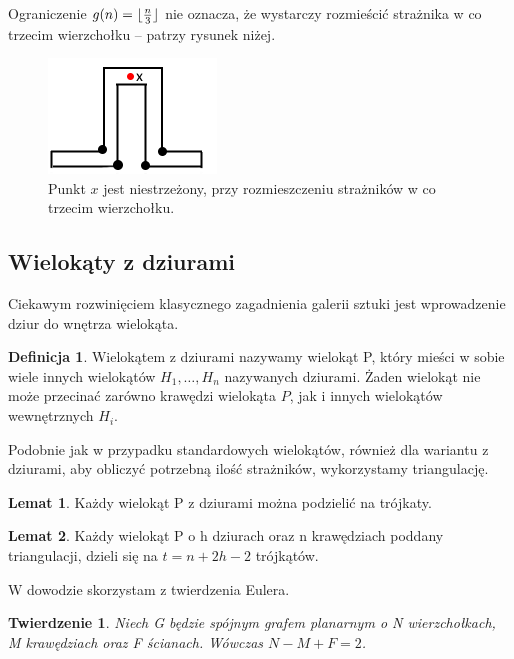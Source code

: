 \documentclass[brudnopis]{xmgr}
\DeclarePairedDelimiter\floor{\lfloor}{\rfloor}
\newtheorem{Twierdzenie}{Twierdzenie} \theoremstyle{definition}
\newtheorem{Lemat}{Lemat} \theoremstyle{definition}
\newtheorem{Definicja}{Definicja} \theoremstyle{definition}
\begin{document}
\newpage\indent Ograniczenie $g(n) = \floor{\frac{n}{3}}$ nie oznacza, że wystarczy rozmieścić strażnika w co trzecim wierzchołku -- patrzy rysunek niżej.
\begin{figure}[ht!]
  \centering
  \includegraphics{rysunki/co_trzeci.png}
  \caption{Punkt $x$ jest niestrzeżony, przy rozmieszczeniu strażników w co trzecim wierzchołku.}
\end{figure} 

\subsection{Wielokąty z dziurami}
Ciekawym rozwinięciem klasycznego zagadnienia galerii sztuki jest wprowadzenie dziur do wnętrza wielokąta.

\begin{Definicja}\label{def wielokat z dziurami}
  \textnormal{Wielokątem z dziurami} nazywamy wielokąt P, który mieści w sobie wiele innych wielokątów $H_1, \ldots, H_n$ nazywanych dziurami.
  Żaden wielokąt nie może przecinać zarówno krawędzi wielokąta $P$, jak i innych wielokątów wewnętrznych $H_i$.
\end{Definicja}

\indent Podobnie jak w przypadku standardowych wielokątów, również dla wariantu z dziurami, aby obliczyć potrzebną ilość strażników, wykorzystamy triangulację.

\begin{Lemat}
  Każdy wielokąt P z dziurami można podzielić na trójkaty.
\end{Lemat}

\begin{Lemat}\label{t trójkątów triangulacja}
  Każdy wielokąt P o \textnormal{h} dziurach oraz \textnormal{n} krawędziach poddany triangulacji, dzieli się na $t = n + 2h - 2$ trójkątów.
\end{Lemat}

W dowodzie skorzystam z twierdzenia Eulera.
\begin{Twierdzenie}\label{tw eulera}
  Niech G będzie spójnym grafem planarnym o N wierzchołkach, M krawędziach oraz F ścianach. Wówczas $N - M + F = 2$.
\end{Twierdzenie}
\end{document}
